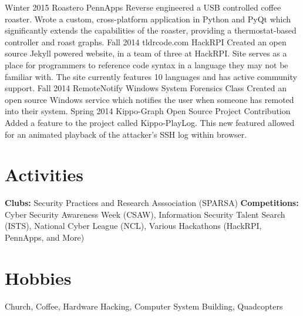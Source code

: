\documentclass[]{CalebCoffie-CV-Class} %
\begin{document}
\begin{entrylist}
\entry
{Winter 2015}
{Roastero}
{PennApps}
{Reverse engineered a USB controlled coffee roaster. Wrote a custom, cross-platform application in Python and PyQt which significantly extends the capabilities of the roaster, providing a thermostat-based controller and roast graphs.}
\entry
{Fall 2014}
{tldrcode.com}
{HackRPI}
{Created an open source Jekyll powered website, in a team of three at HackRPI. Site serves as a place for programmers to reference code syntax in a language they may not be familiar with. The site currently features 10 languages and has active community support.}
\entry
{Fall 2014}
{RemoteNotify}
{Windows System Forensics Class}
{Created an open source Windows service which notifies the user when someone has remoted into their system.}
\entry
{Spring 2014}
{Kippo-Graph}
{Open Source Project Contribution}
{Added a feature to the project called Kippo-PlayLog. This new featured allowed for an animated playback of the attacker’s SSH log within browser.}
\end{entrylist}

\section{Activities}

\textbf{Clubs:} Security Practices and Research Asssociation (SPARSA) \textbf{Competitions:} Cyber Security Awareness Week (CSAW), Information Security Talent Search (ISTS), National Cyber League (NCL), Various Hackathons (HackRPI, PennApps, and More)



\section{Hobbies}

Church, Coffee, Hardware Hacking, Computer System Building, Quadcopters
\end{document}
